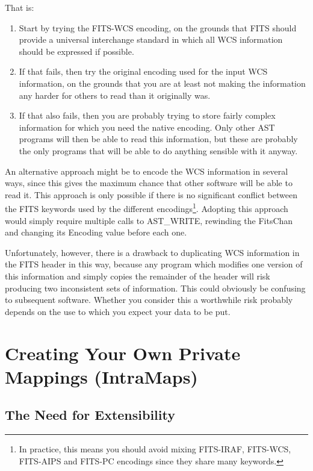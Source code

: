 \documentclass[twoside,11pt]{article}
\begin{document}
That is:

\begin{enumerate}
\item Start by trying the FITS-WCS encoding, on the grounds that FITS
should provide a universal interchange standard in which all WCS
information should be expressed if possible. 

\item If that fails, then try the original encoding used for the input
WCS information, on the grounds that you are at least not making the
information any harder for others to read than it originally was.

\item If that also fails, then you are probably trying to store fairly
complex information for which you need the native encoding. Only other
AST programs will then be able to read this information, but these are
probably the only programs that will be able to do anything sensible
with it anyway.
\end{enumerate}

An alternative approach might be to encode the WCS information in several
ways, since this gives the maximum chance that other software will be
able to read it. This approach is only possible if there is no
significant conflict between the FITS keywords used by the different
encodings\footnote{In practice, this means you should avoid mixing
FITS-IRAF, FITS-WCS, FITS-AIPS and FITS-PC encodings since they share
many keywords.}.  Adopting this approach would simply require multiple
calls to AST\_WRITE, rewinding the FitsChan and changing its Encoding value
before each one.

Unfortunately, however, there is a drawback to duplicating WCS
information in the FITS header in this way, because any program which
modifies one version of this information and simply copies the
remainder of the header will risk producing two inconsistent sets of
information. This could obviously be confusing to subsequent
software. Whether you consider this a worthwhile risk probably depends
on the use to which you expect your data to be put.

\cleardoublepage
\section{\label{ss:intramaps}Creating Your Own Private Mappings (IntraMaps)}

\subsection{The Need for Extensibility}
\end{document}
